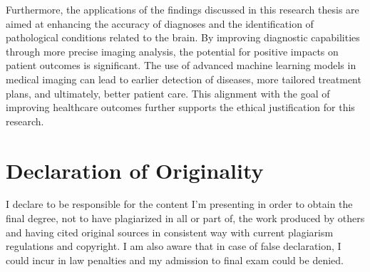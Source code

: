 Furthermore, the applications of the findings discussed in this research thesis
are aimed at enhancing the accuracy of diagnoses and the identification of
pathological conditions related to the brain. By improving diagnostic
capabilities through more precise imaging analysis, the potential for positive
impacts on patient outcomes is significant. The use of advanced machine learning
models in medical imaging can lead to earlier detection of diseases, more
tailored treatment plans, and ultimately, better patient care. This alignment
with the goal of improving healthcare outcomes further supports the ethical
justification for this research.

\section*{Declaration of Originality}
I declare to be responsible for the content I'm presenting in order to
obtain the final degree, not to have plagiarized in all or part of, the work
produced by others and having cited original sources in consistent way with
current plagiarism regulations and copyright. I am also aware that in case of
false declaration, I could incur in law penalties and my admission to final exam
could be denied.